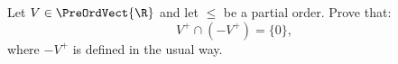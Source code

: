 %
%
\label {ex: if the underlying relation on a preordered vector space is a partial order then we get the cone condition}Let $V \in \PreOrdVect{\R}$ and let $\leq$ be a partial order. Prove that:
\[V^+ \cap (-V^+) = \{0\},\]
where $-V^+$ is defined in the usual way.
